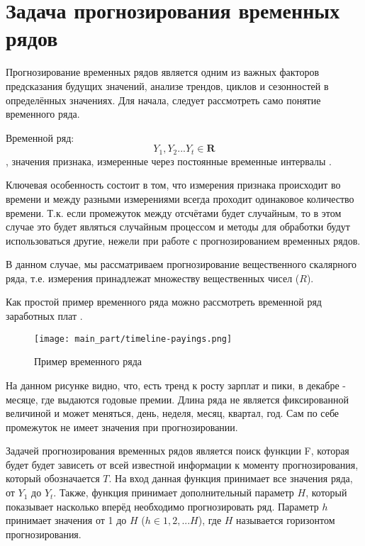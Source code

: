 \section{Задача прогнозирования временных рядов}
\label{sec:purpose}

Прогнозирование временных рядов является одним из важных факторов предсказания будущих значений, анализе трендов, циклов и сезонностей в определённых
значениях. Для начала, следует рассмотреть само понятие временного ряда.

Временной ряд: \begin{equation}\label{timeline_value} Y_1, Y_2 ... Y_t \in \mathbf{R}  \end{equation}, значения признака, измеренные через постоянные временные интервалы \cite{wiki}.

Ключевая особенность состоит в том, что измерения признака происходит во времени и между разными измерениями всегда проходит одинаковое количество времени.
Т.к. если промежуток между отсчётами будет случайным, то в этом случае это будет являться случайным процессом и методы для обработки будут использоваться другие, нежели
при работе с прогнозированием временных рядов.

В данном случае, мы рассматриваем прогнозирование вещественного скалярного ряда, т.е. измерения принадлежат множеству вещественных чисел ($R$).

Как простой пример временного ряда можно рассмотреть временной ряд заработных плат \cite{datamining_in_action}.

\begin{figure}[h]
\centering
	\texttt{[image: main\_part/timeline-payings.png]}
	\caption{Пример временного ряда}
	\label{sec:purpose:payings}
\end{figure}

На данном рисунке видно, что, есть тренд к росту зарплат и пики, в декабре - месяце, где выдаются годовые премии. Длина ряда не является фиксированной величиной и может меняться, день, неделя, месяц, квартал, год. Сам по себе промежуток не имеет значения при прогнозировании.

Задачей прогнозирования временных рядов является поиск функции F, которая будет будет зависеть от всей известной информации к моменту прогнозирования, который обозначается $ T $. На вход данная функция принимает все значения ряда, от $ Y_1$ до $ Y_t $. Также, функция принимает дополнительный параметр $ H $, который показывает насколько вперёд необходимо прогнозировать ряд. Параметр $h$ принимает значения от 1 до $ H $ ($ h \in {1, 2, ... H} $), где $ H $ называется горизонтом прогнозирования.

